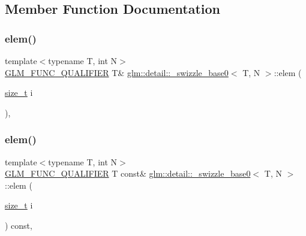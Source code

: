 \subsection{Member Function Documentation}
\mbox{\label{structglm_1_1detail_1_1__swizzle__base0_a4011ff1a445ccda72c385462106eb3ff}} 
\subsubsection{\texorpdfstring{elem()}{elem()}\hspace{0.1cm}{\footnotesize\ttfamily [1/2]}}
{\footnotesize\ttfamily template$<$typename T, int N$>$ \\
\mbox{\hyperlink{setup_8hpp_a33fdea6f91c5f834105f7415e2a64407}{G\+L\+M\+\_\+\+F\+U\+N\+C\+\_\+\+Q\+U\+A\+L\+I\+F\+I\+ER}} T\& \mbox{\hyperlink{structglm_1_1detail_1_1__swizzle__base0}{glm\+::detail\+::\+\_\+swizzle\+\_\+base0}}$<$ T, N $>$\+::elem (\begin{DoxyParamCaption}\item[{\mbox{\hyperlink{_s_d_l__config__winrt_8h_a7c94ea6f8948649f8d181ae55911eeaf}{size\+\_\+t}}}]{i }\end{DoxyParamCaption})\hspace{0.3cm}{\ttfamily [inline]}, {\ttfamily [protected]}}

\mbox{\label{structglm_1_1detail_1_1__swizzle__base0_a495081f60b8fc565a5a35bfdd8b13c84}} 
\subsubsection{\texorpdfstring{elem()}{elem()}\hspace{0.1cm}{\footnotesize\ttfamily [2/2]}}
{\footnotesize\ttfamily template$<$typename T, int N$>$ \\
\mbox{\hyperlink{setup_8hpp_a33fdea6f91c5f834105f7415e2a64407}{G\+L\+M\+\_\+\+F\+U\+N\+C\+\_\+\+Q\+U\+A\+L\+I\+F\+I\+ER}} T const\& \mbox{\hyperlink{structglm_1_1detail_1_1__swizzle__base0}{glm\+::detail\+::\+\_\+swizzle\+\_\+base0}}$<$ T, N $>$\+::elem (\begin{DoxyParamCaption}\item[{\mbox{\hyperlink{_s_d_l__config__winrt_8h_a7c94ea6f8948649f8d181ae55911eeaf}{size\+\_\+t}}}]{i }\end{DoxyParamCaption}) const\hspace{0.3cm}{\ttfamily [inline]}, {\ttfamily [protected]}}



